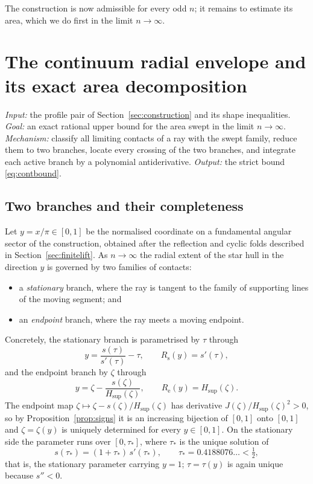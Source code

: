 \documentclass[11pt]{article}
\theoremstyle{plain}
\theoremstyle{definition}
\theoremstyle{remark}
\newcommand{\Rsta}{R_{\mathrm{s}}}
\newcommand{\Rend}{R_{\mathrm{e}}}
\newcommand{\Hsup}{H_{\mathrm{sup}}}
\begin{document}
The construction is now admissible for every odd $n$; it remains to estimate its
area, which we do first in the limit $n\to\infty$.

\section{The continuum radial envelope and its exact area decomposition}
\label{sec:envelope}

\emph{Input:} the profile pair of Section~\ref{sec:construction} and its shape
inequalities. \emph{Goal:} an exact rational upper bound for the area swept in
the limit $n\to\infty$. \emph{Mechanism:} classify all limiting contacts of a
ray with the swept family, reduce them to two branches, locate every crossing of
the two branches, and integrate each active branch by a polynomial
antiderivative. \emph{Output:} the strict bound \eqref{eq:contbound}.

\subsection{Two branches and their completeness}

Let $y=x/\pi\in[0,1]$ be the normalised coordinate on a fundamental angular
sector of the construction, obtained after the reflection and cyclic folds
described in Section~\ref{sec:finitelift}. As $n\to\infty$ the radial extent of
the star hull in the direction $y$ is governed by two families of contacts:
\begin{itemize}
  \item a \emph{stationary} branch, where the ray is tangent to the family of
    supporting lines of the moving segment; and
  \item an \emph{endpoint} branch, where the ray meets a moving endpoint.
\end{itemize}
Concretely, the stationary branch is parametrised by $\tau$ through
\begin{equation}\label{eq:stationary}
  y=\frac{s(\tau)}{s'(\tau)}-\tau,\qquad \Rsta(y)=s'(\tau),
\end{equation}
and the endpoint branch by $\zeta$ through
\begin{equation}\label{eq:endpoint}
  y=\zeta-\frac{s(\zeta)}{\Hsup(\zeta)},\qquad \Rend(y)=\Hsup(\zeta).
\end{equation}
The endpoint map $\zeta\mapsto\zeta-s(\zeta)/\Hsup(\zeta)$ has derivative
$J(\zeta)/\Hsup(\zeta)^{2}>0$, so by Proposition~\ref{prop:signs} it is an
increasing bijection of $[0,1]$ onto $[0,1]$ and $\zeta=\zeta(y)$ is uniquely
determined for every $y\in[0,1]$. On the stationary side the parameter runs over
$[0,\tau_{*}]$, where $\tau_{*}$ is the unique solution of
\begin{equation}\label{eq:taustar}
  s(\tau_{*})=(1+\tau_{*})\,s'(\tau_{*}),
  \qquad \tau_{*}=0.4188076\ldots<\tfrac12,
\end{equation}
that is, the stationary parameter carrying $y=1$; $\tau=\tau(y)$ is again unique
because $s''<0$.
\end{document}
